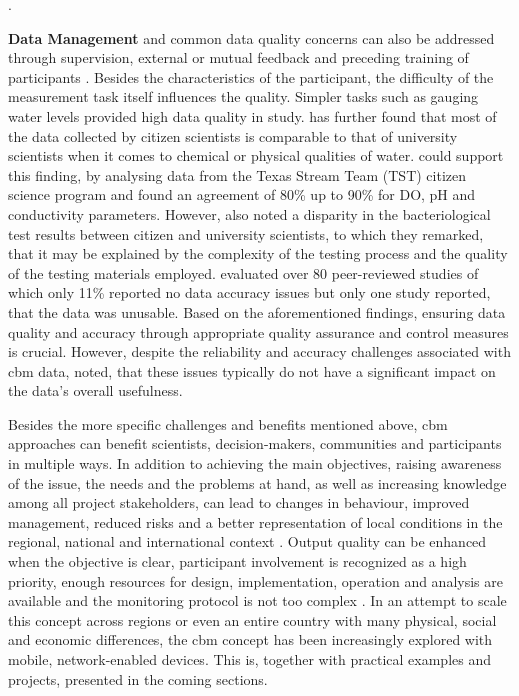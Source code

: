 \autocite{fraislCitizenScienceEnvironmental2022,lackstromBackyardHydroclimatologyCitizen2022}.

\textbf{Data Management} and common data quality concerns can also be addressed through supervision, external or mutual feedback and preceding training of participants \autocite{albusAccuracyLongtermVolunteer2020,baalbakiCitizenScienceLebanon2019,fraislCitizenScienceEnvironmental2022}. Besides the characteristics of the participant, the difficulty of the measurement task itself influences the quality. Simpler tasks such as gauging water levels provided high data quality in \autocite{weeserCitizenSciencePioneers2018a} study. \autocite{baalbakiCitizenScienceLebanon2019} has further found that most of the data collected by citizen scientists is comparable to that of university scientists when it comes to chemical or physical qualities of water. \autocite{albusAccuracyLongtermVolunteer2020} could support this finding, by analysing data from the Texas Stream Team (TST) citizen science program and found an agreement of 80\% up to 90\% for DO, pH and conductivity parameters. However, \autocite{baalbakiCitizenScienceLebanon2019} also noted a disparity in the bacteriological test results between citizen and university scientists, to which they remarked, that it may be explained by the complexity of the testing process and the quality of the testing materials employed. \autocite{aceves-buenoCitizenScienceApproach2015} evaluated over 80 peer-reviewed studies of which only 11\% reported no data accuracy issues but only one study reported, that the data was unusable. Based on the aforementioned findings, ensuring data quality and accuracy through appropriate quality assurance and control measures is crucial. However, despite the reliability and accuracy challenges associated with \acrshort{cbm} data, \autocite{aceves-buenoCitizenScienceApproach2015} noted, that these issues typically do not have a significant impact on the data's overall usefulness.

Besides the more specific challenges and benefits mentioned above, \acrlong{cbm} approaches can benefit scientists, decision-makers, communities and participants in multiple ways. In addition to achieving the main objectives, raising awareness of the issue, the needs and the problems at hand, as well as increasing knowledge among all project stakeholders, can lead to changes in behaviour, improved management, reduced risks and a better representation of local conditions in the regional, national and international context \autocite{huangManagementDrinkingWater2020,walkerBenefitsNegativeImpacts2021}. Output quality can be enhanced when the objective is clear, participant involvement is recognized as a high priority, enough resources for design, implementation, operation and analysis are available and the monitoring protocol is not too complex \autocite{butteFrameworkWaterSecurity2022, pocockStrategicFrameworkSupport}.\newline
In an attempt to scale this concept across regions or even an entire country with many physical, social and economic differences, the \acrshort{cbm} concept has been increasingly explored with mobile, network-enabled devices. This is, together with practical examples and projects, presented in the coming sections.



